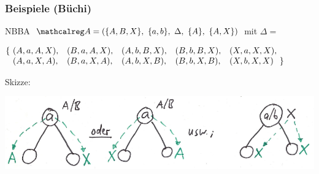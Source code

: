 \begin{frame}
  \frametitle{Beispiele (Büchi)}

  \begin{Itemize}
    \item<+->
      NBBA $\Aut{A}=(\{A,B,X\},~\{a,b\},~\Delta,~\{A\},~\{A,X\})$ mit $\Delta = $%
      \par\medskip
      \begin{small}
        \mbox{$
          \begin{array}{@{}r@{~}l@{~~}l@{~~}l@{~~}l@{~~}l@{~}l@{}}
            \{ & (A,a,A,X),~ & (B,a,A,X),~ & (A,b,B,X),~ & (B,b,B,X),~ & (X,a,X,X), &    \\
               & (A,a,X,A),~ & (B,a,X,A),~ & (A,b,X,B),~ & (B,b,X,B),~ & (X,b,X,X)  & \}
          \end{array}
        $\hspace*{-10mm}}

        \par\smallskip
        Skizze:
        \par\vspace*{-\baselineskip}
        \begin{center}
          \includegraphics[scale=.5]{img/beispielautomaten_2.pdf}
        \end{center}
      \end{small}


\end{Itemize}
\end{frame}
